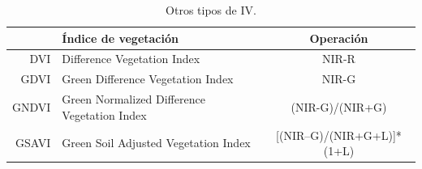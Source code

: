 \begin{table}[h]
	\centering
	\begin{tabular}{@{}rlc@{}}
	\toprule[0.4mm]
	& Índice de vegetación & Operación\\
	\midrule
	DVI & Difference Vegetation Index & NIR-R\\
	GDVI & Green Difference Vegetation Index & NIR-G\\
	GNDVI & Green Normalized Difference Vegetation Index & (NIR-G)/(NIR+G)\\
	GSAVI & Green Soil Adjusted Vegetation Index & [(NIR–G)/(NIR+G+L)]*(1+L)\\
	\bottomrule[0.4mm]
	\end{tabular}
	\caption[Otros tipos de índices de vegetación]{Otros tipos de \ac{IV}.}
	\label{tab:otros_iv}
\end{table}